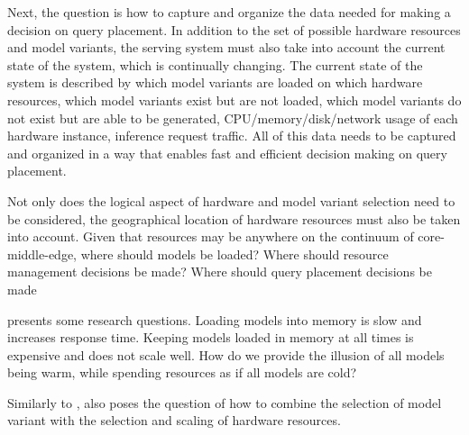 Next, the question is how to capture and organize the data needed for making a decision on query placement.
In addition to the set of possible hardware resources and model variants, the serving system must also take into account the current state of the system, which is continually changing.
The current state of the system is described by which model variants are loaded on which hardware resources, which model variants exist but are not loaded, which model variants do not exist but are able to be generated, CPU/memory/disk/network usage of each hardware instance, inference request traffic.
All of this data needs to be captured and organized in a way that enables fast and efficient decision making on query placement.

Not only does the logical aspect of hardware and model variant selection need to be considered, the geographical location of hardware resources must also be taken into account.
Given that resources may be anywhere on the continuum of core-middle-edge, where should models be loaded?
Where should resource management decisions be made?
Where should query placement decisions be made

\textcite{Zhang2020} presents some research questions.
Loading models into memory is slow and increases response time.
Keeping models loaded in memory at all times is expensive and does not scale well.
How do we provide the illusion of all models being warm, while spending resources as if all models are cold?

Similarly to \cite{Yadwadkar2019}, \cite{Zhang2020} also poses the question of how to combine the selection of model variant with the selection and scaling of hardware resources.

